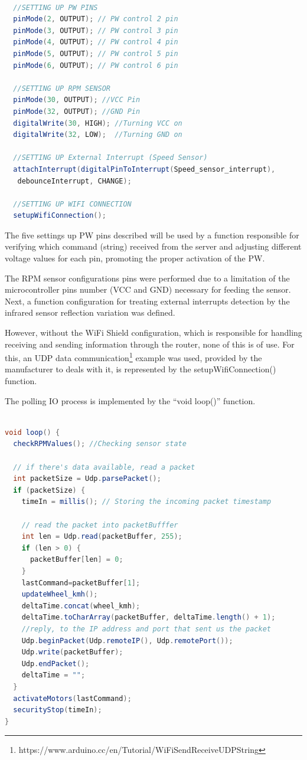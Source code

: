 \begin{lstlisting}[frame=single,language=Java]  % Start your code-block
  
  //SETTING UP PW PINS
  pinMode(2, OUTPUT); // PW control 2 pin
  pinMode(3, OUTPUT); // PW control 3 pin
  pinMode(4, OUTPUT); // PW control 4 pin
  pinMode(5, OUTPUT); // PW control 5 pin
  pinMode(6, OUTPUT); // PW control 6 pin

  //SETTING UP RPM SENSOR
  pinMode(30, OUTPUT); //VCC Pin
  pinMode(32, OUTPUT); //GND Pin
  digitalWrite(30, HIGH); //Turning VCC on
  digitalWrite(32, LOW);  //Turning GND on
  
  //SETTING UP External Interrupt (Speed Sensor)
  attachInterrupt(digitalPinToInterrupt(Speed_sensor_interrupt), 
   debounceInterrupt, CHANGE);

  //SETTING UP WIFI CONNECTION
  setupWifiConnection();
\end{lstlisting}

The five settings up PW pins described will be used by a function responsible for verifying which command (string) received from the server and adjusting different voltage values for each pin, promoting the proper activation of the PW.


The RPM sensor configurations pins were performed due to a limitation of the microcontroller pins number (VCC and GND)  necessary for feeding the sensor. Next, a function configuration for treating external interrupts detection by the infrared sensor reflection variation was defined. 

However, without the WiFi Shield configuration, which is responsible for handling receiving and sending information through the router, none of this is of use. For this, an UDP data communication\footnote {https://www.arduino.cc/en/Tutorial/WiFiSendReceiveUDPString}  example was used, provided by the manufacturer to deals with it, is represented by the setupWifiConnection() function.

The polling IO process is implemented by the ``void loop()'' function.\newline

\begin{lstlisting}[frame=single,language=Java]  % Start your code-block
  
void loop() {
  checkRPMValues(); //Checking sensor state

  // if there's data available, read a packet
  int packetSize = Udp.parsePacket();
  if (packetSize) {
    timeIn = millis(); // Storing the incoming packet timestamp

    // read the packet into packetBufffer
    int len = Udp.read(packetBuffer, 255);
    if (len > 0) {
      packetBuffer[len] = 0;
    }
    lastCommand=packetBuffer[1];
    updateWheel_kmh();
    deltaTime.concat(wheel_kmh);
    deltaTime.toCharArray(packetBuffer, deltaTime.length() + 1);
    //reply, to the IP address and port that sent us the packet
    Udp.beginPacket(Udp.remoteIP(), Udp.remotePort());
    Udp.write(packetBuffer);
    Udp.endPacket();
    deltaTime = "";
  }
  activateMotors(lastCommand);
  securityStop(timeIn);
}
\end{lstlisting}

